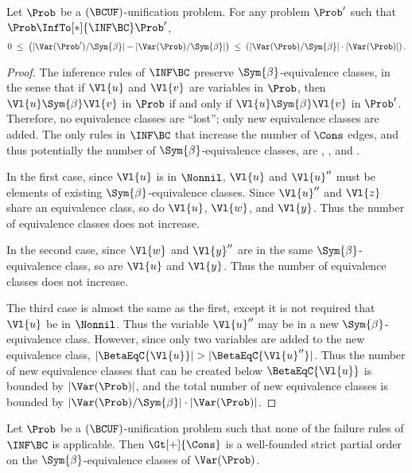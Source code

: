 \begin{Lemma}\label{lemma:equiv-class-bound}
    Let $\Prob$ be a $(\BCUF)$-unification problem. For any problem $\Prob'$
    such that $\Prob \InfTo[*]{\INF\BC} \Prob'$,
    \[ 0 \; \leq \;
       \left(|\Var(\Prob') / {\Sym{\beta}}| - |\Var(\Prob) / {\Sym{\beta}}|\right)
       \; \leq \;
       \left(|\Var(\Prob) / {\Sym{\beta}}| \cdot |\Var(\Prob)|\right). \]
\end{Lemma}

\begin{proof}
    The inference rules of $\INF\BC$ preserve $\Sym{\beta}$-equivalence classes,
    in the sense that if $\Vl{u}$ and $\Vl{v}$ are variables in $\Prob$, then
    $\Vl{u} \Sym{\beta} \Vl{v}$ in $\Prob$ if and only if $\Vl{u} \Sym{\beta}
    \Vl{v}$ in $\Prob'$. Therefore, no equivalence classes are ``lost''; only
    new equivalence classes are added.
    The only rules in $\INF\BC$ that increase the number of $\Cons$ edges, and
    thus potentially the number of $\Sym{\beta}$-equivalence classes, are
    , , and .

    In the first case, since $\Vl{u}$ is in $\Nonnil$, $\Vl{u}$ and $\Vl{u}''$
    must be elements of existing $\Sym{\beta}$-equivalence classes. Since
    $\Vl{u}''$ and $\Vl{z}$ share an equivalence class, so do $\Vl{u}$,
    $\Vl{w}$, and $\Vl{y}$. Thus the number of equivalence classes does not
    increase.

    In the second case, since $\Vl{w}$ and $\Vl{y}''$ are in the same
    $\Sym{\beta}$-equivalence class, so are $\Vl{u}$ and $\Vl{y}$. Thus the
    number of equivalence classes does not increase.

    The third case is almost the same as the first, except it is not required
    that $\Vl{u}$ be in $\Nonnil$. Thus the variable $\Vl{u}''$ may be in a new
    $\Sym{\beta}$-equivalence class. However, since only two variables are
    added to the new equivalence class, $|\BetaEqC{\Vl{u}}| >
    |\BetaEqC{\Vl{u}''}|$. Thus the number of new equivalence classes that can
    be created below $\BetaEqC{\Vl{u}}$ is bounded by $|\Var(\Prob)|$, and the
    total number of new equivalence classes is bounded by $|\Var(\Prob) /
    {\Sym{\beta}}| \cdot |\Var(\Prob)|$.
\end{proof}

\begin{Lemma}\label{lemma:gt-cons-partial-order}
    Let $\Prob$ be a $(\BCUF)$-unification problem such that none of the
    failure rules of $\INF\BC$ is applicable. Then $\Gt[+]{\Cons}$ is a
    wel{}l-founded strict partial order on the $\Sym{\beta}$-equivalence
    classes of $\Var(\Prob)$.
\end{Lemma}

